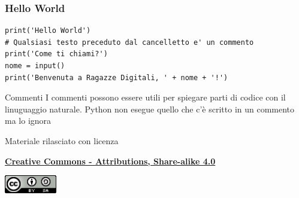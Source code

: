 \documentclass{beamer}
\begin{document}
\begin{frame}[fragile]
\frametitle{Hello World}

    \begin{lstlisting}
print('Hello World')
# Qualsiasi testo preceduto dal cancelletto e' un commento
print('Come ti chiami?')
nome = input()
print('Benvenuta a Ragazze Digitali, ' + nome + '!')
    \end{lstlisting}

\end{frame}

\begin{frame}{Commenti}
        I commenti possono essere utili per spiegare parti di codice con il linuguaggio naturale.
        Python non esegue quello che c'è scritto in un commento ma lo ignora
\end{frame}

\begin{frame}

\begin{center}
    \bigskip
    Materiale rilasciato con licenza
    
    \textbf{\href{http://creativecommons.org/licenses/by-sa/4.0/}{Creative Commons - Attributions, Share-alike 4.0}}
    
    \medskip
    \includegraphics[height=0.8cm]{images/cc.png}
\end{center}

\end{frame}
\end{document}
